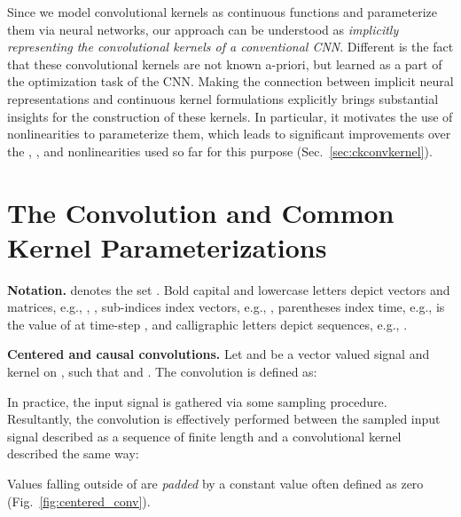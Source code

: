 \documentclass{article}
\begin{document}
Since we model convolutional kernels as continuous functions and parameterize them via neural networks, our approach can be understood as \textit{implicitly representing the convolutional kernels of a conventional CNN}.
Different is the fact that these convolutional kernels are not known a-priori, but learned as a part of the optimization task of the CNN. Making the connection between implicit neural representations and continuous kernel formulations explicitly brings substantial insights for the construction of these kernels. In particular, it motivates the use of  nonlinearities \citep{sitzmann2020implicit} to parameterize them, which leads to significant improvements over the , , and  nonlinearities used so far for this purpose (Sec.~\ref{sec:ckconvkernel}).

\vspace{-2mm}
\section{The Convolution and Common Kernel Parameterizations}\label{sec:convolution}
\vspace{-2mm}
\textbf{Notation.}  denotes the set . Bold capital and lowercase letters depict vectors and matrices, e.g., , , sub-indices index vectors, e.g., , parentheses index time, e.g.,  is the value of  at time-step , and calligraphic letters depict sequences, e.g., . 


\textbf{Centered and causal convolutions.} 
Let  and  be a vector valued signal and kernel on , such that  and . The convolution is defined as:

In practice, the input signal  is gathered via some sampling procedure. Resultantly, the convolution is effectively performed between the sampled input signal described as a sequence of finite length  and a convolutional kernel  described the same way:

Values  falling outside of  are \textit{padded} by a constant value often defined as zero (Fig.~\ref{fig:centered_conv}).
\end{document}
